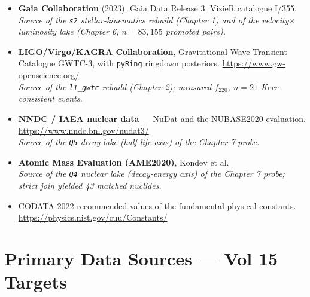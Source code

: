 \documentclass[11pt, letterpaper, openany]{book}
\begin{document}
\begin{itemize}
    \item \textbf{Gaia Collaboration} (2023). Gaia Data Release 3. VizieR catalogue I/355.
          \\ \textit{Source of the \texttt{s2} stellar-kinematics rebuild (Chapter 1) and of the
          velocity$\times$luminosity lake (Chapter 6, $n = 83{,}155$ promoted pairs).}
    \item \textbf{LIGO/Virgo/KAGRA Collaboration}, Gravitational-Wave Transient Catalogue GWTC-3,
          with \texttt{pyRing} ringdown posteriors. \url{https://www.gw-openscience.org/}
          \\ \textit{Source of the \texttt{l1\_gwtc} rebuild (Chapter 2); measured $f_{220}$,
          $n = 21$ Kerr-consistent events.}
    \item \textbf{NNDC / IAEA nuclear data} --- NuDat and the NUBASE2020 evaluation.
          \url{https://www.nndc.bnl.gov/nudat3/}
          \\ \textit{Source of the \texttt{Q5} decay lake (half-life axis) of the Chapter 7 probe.}
    \item \textbf{Atomic Mass Evaluation (AME2020)}, Kondev et al.
          \\ \textit{Source of the \texttt{Q4} nuclear lake (decay-energy axis) of the Chapter 7
          probe; strict join yielded 43 matched nuclides.}
    \item CODATA 2022 recommended values of the fundamental physical constants.
          \url{https://physics.nist.gov/cuu/Constants/}
\end{itemize}

\section*{Primary Data Sources --- Vol 15 Targets}
\end{document}
